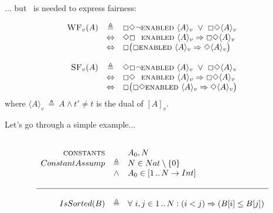 {

... but \enabled\ is needed to express fairness: 

\vspace{25pt}

\begin{definition}[Fairness]
\[
\begin{array}{r c l}
\textsc{WF}_v(A) & \triangleq & \Box \Diamond \neg \textsc{enabled}\ \langle A \rangle_v \ \vee\ \Box \Diamond \langle A \rangle _v \\
& \Leftrightarrow & \Diamond \Box \hspace{7pt} \textsc{enabled}\ \langle A \rangle_v \Rightarrow \Box \Diamond \langle A \rangle_v \\
& \Leftrightarrow & \Box \big( \Box \textsc{enabled}\ \langle A \rangle_v \Rightarrow \Diamond \langle A \rangle_v \big) \\
\\
\textsc{SF}_v(A) & \triangleq & \Diamond  \Box \neg \textsc{enabled}\ \langle A \rangle_v \ \vee\ \Box \Diamond \langle A \rangle _v \\
& \Leftrightarrow &  \Box \Diamond \hspace{7pt} \textsc{enabled}\ \langle A \rangle_v \Rightarrow \Box \Diamond \langle A \rangle_v \\
& \Leftrightarrow & \Box \big( \Box \Diamond  \textsc{enabled}\ \langle A \rangle_v \Rightarrow \Diamond \langle A \rangle_v \big)

\end{array}
\]
\scriptsize
\hfill where $\langle A \rangle_v \ \triangleq\  A \wedge t' \neq t$ is the dual of $[A]_v$.
\end{definition}

}



 {
{\color{Maroon} Let's go through a simple example... }

}

 {
\footnotesize
\begin{example}
\footnotesize
\[
\begin{array}{r c l}

\\
\kw{constants} 
& & A_0, N \\
%
ConstantAssump 
& \triangleq & N \in Nat \setminus \{0\}\ \\
& \wedge &  A_0 \in [1\, .. \,N \rightarrow Int]\\ 
%
\\ \hline \\
IsSorted(B) & \triangleq 
& \forall\ i, j \in 1\,.. \,N : (i < j) \Rightarrow (B[i] \leq B[j]) \\ \\
\end{array}
\]
\end{example}
}

